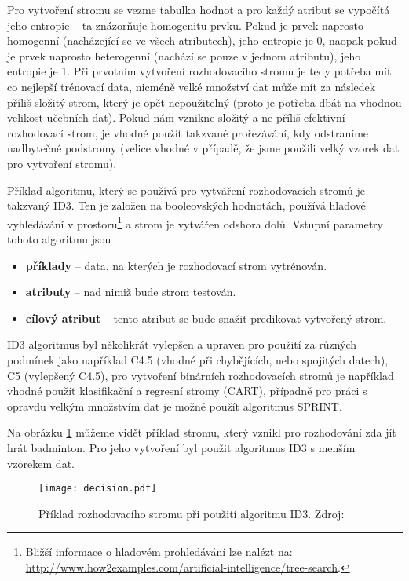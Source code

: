 \par Pro vytvoření stromu se vezme tabulka hodnot a pro každý atribut se vypočítá jeho entropie -- ta znázorňuje homogenitu prvku. Pokud je prvek naprosto homogenní (nacházející se ve všech atributech), jeho entropie je 0, naopak pokud je prvek naprosto heterogenní (nachází se pouze v jednom atributu), jeho entropie je 1. Při prvotním vytvoření rozhodovacího stromu je tedy potřeba mít co nejlepší trénovací data, nicméně velké množství dat může mít za následek příliš složitý strom, který je opět nepoužitelný (proto je potřeba dbát na vhodnou velikost učebních dat). Pokud nám vznikne složitý a ne příliš efektivní rozhodovací strom, je vhodné použít takzvané prořezávání, kdy odstraníme nadbytečné podstromy (velice vhodné v případě, že jsme použili velký vzorek dat pro vytvoření stromu). \cite{data-mining}

\par Příklad algoritmu, který se používá pro vytváření rozhodovacích stromů je takzvaný ID3. Ten je založen na booleovských hodnotách, používá hladové vyhledávání v prostoru\footnote{Bližší informace o hladovém prohledávání lze nalézt na: \url{http://www.how2examples.com/artificial-intelligence/tree-search}.} a strom je vytvářen odshora dolů. Vstupní parametry tohoto algoritmu jsou
\begin{itemize}
\item \textbf{příklady} -- data, na kterých je rozhodovací strom vytrénován.
\item \textbf{atributy} -- nad nimiž bude strom testován.
\item  \textbf{cílový atribut} -- tento atribut se bude snažit predikovat vytvořený strom. \cite{minigbook}
\end{itemize}
ID3 algoritmus byl několikrát vylepšen a upraven pro použití za různých podmínek jako například C4.5 (vhodné při chybějících, nebo spojitých datech), C5 (vylepšený C4.5), pro vytvoření binárních rozhodovacích stromů je například vhodné použít klasifikační a regresní stromy (CART), případně pro práci s opravdu velkým množstvím dat je možné použít algoritmus SPRINT. \cite{minigbook}

\par Na obrázku \ref{decision-tree} můžeme vidět příklad stromu, který vznikl pro rozhodování zda jít hrát badminton. Pro jeho vytvoření byl použit algoritmus ID3 s menším vzorekem dat.
\begin{figure}[htp]
\centering
\texttt{[image: decision.pdf]}
\caption[Příklad rozhodovacího stromu při použití algoritmu ID3]{Příklad rozhodovacího stromu při použití algoritmu ID3. Zdroj: \cite{minigbook}}
\label{decision-tree}
\end{figure}

